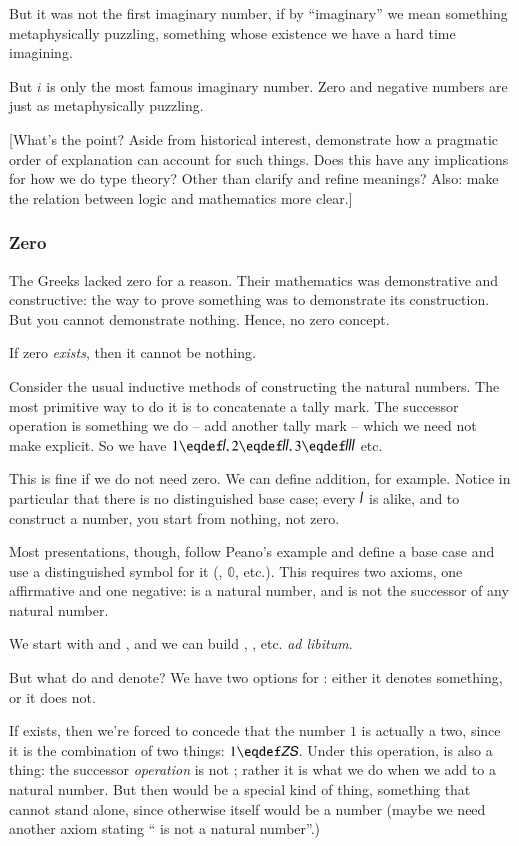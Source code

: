 \documentclass{article}
\begin{document}
But it was not the first imaginary number, if by ``imaginary'' we mean
something metaphysically puzzling, something whose existence we have a
hard time imagining.

But \(i\) is only the most famous imaginary number. Zero and negative
numbers are just as metaphysically puzzling.

[What's the point? Aside from historical interest, demonstrate how a
  pragmatic order of explanation can account for such things. Does
  this have any implications for how we do type theory? Other than
  clarify and refine meanings?  Also: make the relation between logic and mathematics more clear.]

\subsubsection{Zero}

The Greeks lacked zero for a reason. Their mathematics was
demonstrative and constructive: the way to prove something was to
demonstrate its construction. But you cannot demonstrate nothing.
Hence, no zero concept.

If zero \textit{exists}, then it cannot be nothing.

Consider the usual inductive methods of constructing the natural
numbers. The most primitive way to do it is to concatenate a tally
mark. The successor operation is something we do -- add another tally
mark -- which we need not make explicit. So we have \(1\eqdef\Stroke{1},
2\eqdef\Stroke{2}, 3\eqdef\Stroke{3}\) etc.

This is fine if we do not need zero. We can define addition, for
example. Notice in particular that there is no distinguished base
case; every \(\Stroke{1}\) is alike, and to construct a number, you
start from nothing, not zero.

Most presentations, though, follow Peano's example and define a base
case and use a distinguished symbol for it (\ZNat, \(\mathbb{0}\),
etc.). This requires two axioms, one affirmative and one negative:
\ZNat{} is a natural number, and \ZNat{} is not the successor of any
natural number.

We start with \ZNat{} and \SNat{}, and we can build \ZS, \ZSS, etc.
\textit{ad libitum}.

But what do \ZNat{} and \SNat{} denote? We have two options for \ZNat:
either it denotes something, or it does not.

If \ZNat{} exists, then we're forced to concede that the number \(1\)
is actually a two, since it is the combination of two things:
\(1\eqdef \ZS\). Under this operation, \SNat{} is also a thing:
the successor \textit{operation} is not \SNat; rather it is what we do
when we add \SNat{} to a natural number. But then \SNat{} would be a
special kind of thing, something that cannot stand alone, since
otherwise \SNat{} itself would be a number (maybe we need another
axiom stating ``\SNat{} is not a natural number''.)
\end{document}
